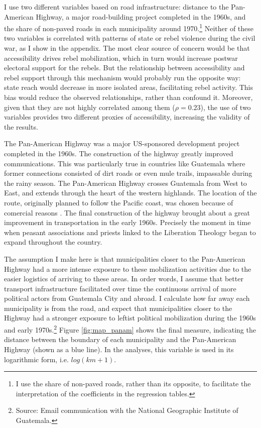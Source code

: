 \documentclass[12pt, notitlepage]{article}
\begin{document}
I use two different variables based on road infrastructure: distance to the Pan-American Highway, a major road-building project completed in the 1960s, and the share of non-paved roads in each municipality around 1970.\footnote{I use the share of non-paved roads, rather than its opposite, to facilitate the interpretation of the coefficients in the regression tables.}
Neither of these two variables is correlated with patterns of state or rebel violence during the civil war, as I show in the appendix.
The most clear source of concern would be that accessibility drives rebel mobilization, which in turn would increase postwar electoral support for the rebels.
But the relationship between accessibility and rebel support through this mechanism would probably run the opposite way: state reach would decrease in more isolated areas, facilitating rebel activity.
This bias would reduce the observed relationships, rather than confound it.
Moreover, given that they are not highly correlated among them ($\rho = 0.23$), the use of two variables provides two different proxies of accessibility, increasing the validity of the results.

The Pan-American Highway was a major US-sponsored development project completed in the 1960s.
The construction of the highway greatly improved communications.
This was particularly true in countries like Guatemala where former connections consisted of dirt roads or even mule trails, impassable during the rainy season.
The Pan-American Highway crosses Guatemala from West to East, and extends through the heart of the western highlands.
The location of the route, originally planned to follow the Pacific coast, was chosen because of comercial reasons \citep{Rutkow:2019aa}.
The final construction of the highway brought about a great improvement in transportation in the early 1960s.
Precisely the moment in time when peasant associations and priests linked to the Liberation Theology began to expand throughout the country.

The assumption I make here is that municipalities closer to the Pan-American Highway had a more intense exposure to these mobilization activities due to the easier logistics of arriving to these areas.
In order words, I assume that better transport infrastructure facilitated over time the continuous arrival of more political actors from Guatemala City and abroad.
I calculate how far away each municipality is from the road, and expect that municipalities closer to the Highway had a stronger exposure to leftist political mobilization during the 1960s and early 1970s.\footnote{Source: Email communication with the National Geographic Institute of Guatemala.}
Figure \ref{fig:map_panam} shows the final measure, indicating the distance between the boundary of each municipality and the Pan-American Highway (shown as a blue line). In the analyses, this variable is used in its logarithmic form, i.e. $log(km + 1)$.
\end{document}
